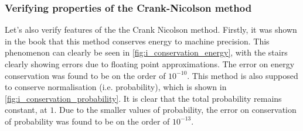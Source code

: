 \subsubsection{Verifying properties of the Crank-Nicolson method}

Let's also verify features of the the Crank Nicolson method. Firstly, it was shown in the book \cite{physnumbook} that this method conserves energy to machine precision. This phenomenon can clearly be seen in \autoref{fig:i_conservation_energy}, with the stairs clearly showing errors due to floating point approximations. The error on energy conservation was found to be on the order of \(10^{-10}\). This method is also supposed to conserve normalisation (i.e. probability), which is shown in \autoref{fig:i_conservation_probability}. It is clear that the total probability remains constant, at \(1\). Due to the smaller values of probability, the error on conservation of probability was found to be on the order of \(10^{-13}\).

